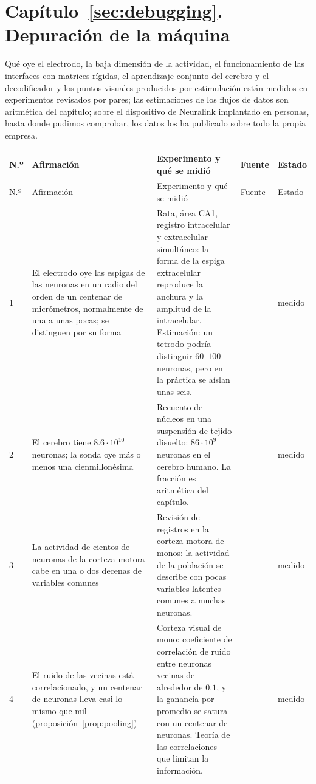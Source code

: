 \section{Capítulo~\ref{sec:debugging}. Depuración de la máquina}

Qué oye el electrodo, la baja dimensión de la actividad, el funcionamiento de las interfaces con matrices rígidas, el aprendizaje conjunto del cerebro y el decodificador y los puntos visuales producidos por estimulación están medidos en experimentos revisados por pares; las estimaciones de los flujos de datos son aritmética del capítulo; sobre el dispositivo de Neuralink implantado en personas, hasta donde pudimos comprobar, los datos los ha publicado sobre todo la propia empresa.

{\footnotesize
\setlength{\tabcolsep}{3pt}\renewcommand{\arraystretch}{1.15}
\begin{longtable}{>{\raggedright}p{0.5cm}>{\raggedright}p{4.0cm}>{\raggedright}p{5.6cm}>{\raggedright}p{2.3cm}>{\raggedright\arraybackslash}p{1.7cm}}
\toprule
N.º & Afirmación & Experimento y qué se midió & Fuente & Estado \\
\midrule\endfirsthead
\toprule
N.º & Afirmación & Experimento y qué se midió & Fuente & Estado \\
\midrule\endhead
1 & El electrodo oye las espigas de las neuronas en un radio del orden de un centenar de micrómetros, normalmente de una a unas pocas; se distinguen por su forma & Rata, área CA1, registro intracelular y extracelular simultáneo: la forma de la espiga extracelular reproduce la anchura y la amplitud de la intracelular. Estimación: un tetrodo podría distinguir $60$--$100$ neuronas, pero en la práctica se aíslan unas seis. & \cite{Henze2000extra} & medido \\
2 & El cerebro tiene $8.6\cdot10^{10}$ neuronas; la sonda oye más o menos una cienmillonésima & Recuento de núcleos en una suspensión de tejido disuelto: $86\cdot10^9$ neuronas en el cerebro humano. La fracción es aritmética del capítulo. & \cite{Azevedo2009} & medido \\
3 & La actividad de cientos de neuronas de la corteza motora cabe en una o dos decenas de variables comunes & Revisión de registros en la corteza motora de monos: la actividad de la población se describe con pocas variables latentes comunes a muchas neuronas. & \cite{Gallego2017} & medido \\
4 & El ruido de las vecinas está correlacionado, y un centenar de neuronas lleva casi lo mismo que mil (proposición~\ref{prop:pooling}) & Corteza visual de mono: coeficiente de correlación de ruido entre neuronas vecinas de alrededor de $0.1$, y la ganancia por promedio se satura con un centenar de neuronas. Teoría de las correlaciones que limitan la información. & \cite{Zohary1994, MorenoBote2014} & medido \\

\end{longtable}}
